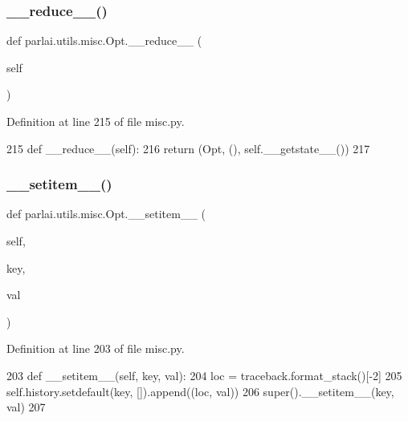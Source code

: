 \subsubsection{\texorpdfstring{\+\_\+\+\_\+reduce\+\_\+\+\_\+()}{\_\_reduce\_\_()}}
{\footnotesize\ttfamily def parlai.\+utils.\+misc.\+Opt.\+\_\+\+\_\+reduce\+\_\+\+\_\+ (\begin{DoxyParamCaption}\item[{}]{self }\end{DoxyParamCaption})}



Definition at line 215 of file misc.\+py.


\begin{DoxyCode}
215     \textcolor{keyword}{def }\_\_reduce\_\_(self):
216         \textcolor{keywordflow}{return} (Opt, (), self.\_\_getstate\_\_())
217 
\end{DoxyCode}
\mbox{\label{classparlai_1_1utils_1_1misc_1_1Opt_a479b52d2a5f00e4b9aac417ee4990915}} 
\subsubsection{\texorpdfstring{\+\_\+\+\_\+setitem\+\_\+\+\_\+()}{\_\_setitem\_\_()}}
{\footnotesize\ttfamily def parlai.\+utils.\+misc.\+Opt.\+\_\+\+\_\+setitem\+\_\+\+\_\+ (\begin{DoxyParamCaption}\item[{}]{self,  }\item[{}]{key,  }\item[{}]{val }\end{DoxyParamCaption})}



Definition at line 203 of file misc.\+py.


\begin{DoxyCode}
203     \textcolor{keyword}{def }\_\_setitem\_\_(self, key, val):
204         loc = traceback.format\_stack()[-2]
205         self.history.setdefault(key, []).append((loc, val))
206         super().\_\_setitem\_\_(key, val)
207 
\end{DoxyCode}
\mbox{\label{classparlai_1_1utils_1_1misc_1_1Opt_ab9abc2aba6c09db1d6e65744dacb6090}} 
